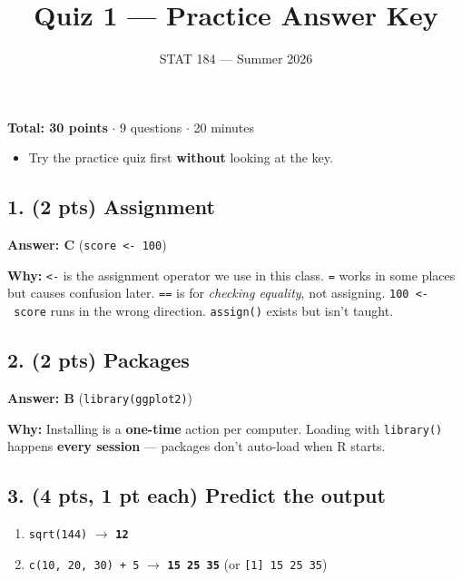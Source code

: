 \documentclass[
  11pt,
  letterpaper,
  DIV=11,
  numbers=noendperiod]{scrartcl}
\title{Quiz 1 --- Practice Answer Key}
\subtitle{STAT 184 --- Summer 2026}
\author{}
\date{}
\providecommand{\tightlist}{%
  \setlength{\itemsep}{0pt}\setlength{\parskip}{0pt}}
\begin{document}
\maketitle

\textbf{Total: 30 points} $\cdot$ 9 questions $\cdot$ 20 minutes

\begin{itemize}
\tightlist
\item Try the practice quiz first \textbf{without} looking at the key.
\end{itemize}

\vspace{0.5em}

\hrulefill

\subsection{1. (2 pts) Assignment}

\textbf{Answer: C} (\texttt{score\ \textless{}-\ 100})

\textbf{Why:} \texttt{\textless{}-} is the assignment operator we use in this class. \texttt{=} works in some places but causes confusion later. \texttt{==} is for \textit{checking equality}, not assigning. \texttt{100\ \textless{}-\ score} runs in the wrong direction. \texttt{assign()} exists but isn't taught.

\hrulefill

\subsection{2. (2 pts) Packages}

\textbf{Answer: B} (\texttt{library(ggplot2)})

\textbf{Why:} Installing is a \textbf{one-time} action per computer. Loading with \texttt{library()} happens \textbf{every session} --- packages don't auto-load when R starts.

\hrulefill

\subsection{3. (4 pts, 1 pt each) Predict the output}

\begin{enumerate}
\def\labelenumi{(\alph{enumi})}
\item \texttt{sqrt(144)} $\rightarrow$ \textbf{\texttt{12}}
\item \texttt{c(10,\ 20,\ 30)\ +\ 5} $\rightarrow$ \textbf{\texttt{15\ 25\ 35}} (or \texttt{[1]\ 15\ 25\ 35})
\end{enumerate}
\end{document}
